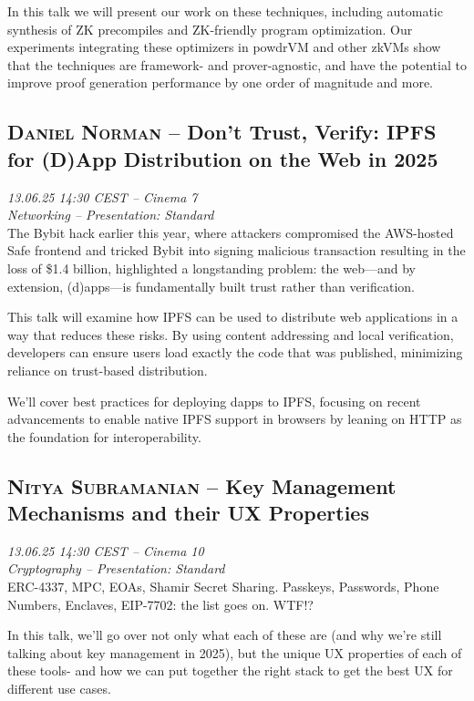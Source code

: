 In this talk we will present our work on these techniques, including automatic
synthesis of ZK precompiles and ZK-friendly program optimization. Our
experiments integrating these optimizers in powdrVM and other zkVMs show that
the techniques are framework- and prover-agnostic, and have the potential to
improve proof generation performance by one order of magnitude and more.

\clearpage
\subsection {\textsc{Daniel Norman}  -- Don’t Trust, Verify: IPFS for (D)App Distribution on the Web in 2025} \noindent \textit {13.06.25 14:30 CEST -- Cinema 7\\ Networking -- Presentation: Standard}\\[1em] The Bybit hack earlier this year, where attackers compromised the AWS-hosted Safe frontend and tricked Bybit into signing malicious transaction resulting in the loss of \$1.4 billion, highlighted a longstanding problem: the web—and by extension, (d)apps—is fundamentally built trust rather than verification.

This talk will examine how IPFS can be used to distribute web applications in a way that reduces these risks. By using content addressing and local verification, developers can ensure users load exactly the code that was published, minimizing reliance on trust-based distribution.

We’ll cover best practices for deploying dapps to IPFS, focusing on recent advancements to enable native IPFS support in browsers by leaning on HTTP as the foundation for interoperability.

\clearpage
\subsection {\textsc{Nitya Subramanian}  -- Key Management Mechanisms and their UX Properties} \noindent \textit {13.06.25 14:30 CEST -- Cinema 10\\ Cryptography -- Presentation: Standard}\\[1em] ERC-4337, MPC, EOAs, Shamir Secret Sharing. Passkeys, Passwords, Phone Numbers, Enclaves, EIP-7702: the list goes on. WTF!?

In this talk, we'll go over not only what each of these are (and why we're still talking about key management in 2025), but the unique UX properties of each of these tools- and how we can put together  the right stack to get the best UX for different use cases.

